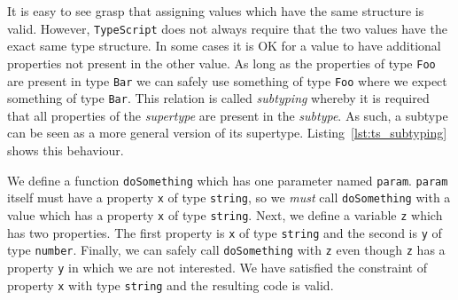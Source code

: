 \documentclass{article}
\newcommand{\ttt}[1]{\texttt{#1}}
\begin{document}
It is easy to see grasp that assigning values which have the same structure is valid.
However, \ttt{TypeScript} does not always require that the two values have the exact same type structure.
In some cases it is OK for a value to have additional properties not present in the other value.
As long as the properties of type \ttt{Foo} are present in type \ttt{Bar} we can safely use something of type \ttt{Foo} where we expect something of type \ttt{Bar}.
This relation is called \textit{subtyping} whereby it is required that all properties of the \textit{supertype} are present in the \textit{subtype}.
As such, a subtype can be seen as a more general version of its supertype.
Listing~\ref{lst:ts_subtyping} shows this behaviour.
\begin{center}
    \begin{minipage}{.75\textwidth}
    
    \end{minipage}
\end{center}
We define a function \ttt{doSomething} which has one parameter named \ttt{param}.
\ttt{param} itself must have a property \ttt{x} of type \ttt{string}, so we \textit{must} call \ttt{doSomething} with a value which has a property \ttt{x} of type \ttt{string}.
Next, we define a variable \ttt{z} which has two properties.
The first property is \ttt{x} of type \ttt{string} and the second is \ttt{y} of type \ttt{number}.
Finally, we can safely call \ttt{doSomething} with \ttt{z} even though \ttt{z} has a property \ttt{y} in which we are not interested.
We have satisfied the constraint of property \ttt{x} with type \ttt{string} and the resulting code is valid.
\end{document}

